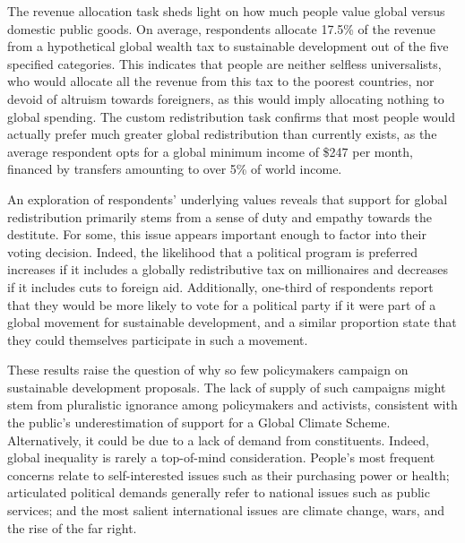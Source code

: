 \documentclass[12pt,english]{article}
\begin{document}
\begin{bibunit}
The revenue allocation task sheds light on how much people value global versus domestic public goods. On average, respondents allocate 17.5\% of the revenue from a hypothetical global wealth tax to sustainable development out of the five specified categories. 
This indicates that people are neither selfless universalists, who would allocate all the revenue from this tax to the poorest countries, nor devoid of altruism towards foreigners, as this would imply allocating nothing to global spending. 
The custom redistribution task confirms that most people would actually prefer much greater global redistribution than currently exists, as the average respondent opts for a global minimum income of \$247 per month, financed by transfers amounting to over 5\% of world income. 

An exploration of respondents' underlying values reveals that support for global redistribution primarily stems from a sense of duty and empathy towards the destitute. For some, this issue appears important enough to factor into their voting decision. Indeed, the likelihood that a political program is preferred increases if it includes a globally redistributive tax on millionaires and decreases if it includes cuts to foreign aid. Additionally, one-third of respondents report that they would be more likely to vote for a political party if it were part of a global movement for sustainable development, and a similar proportion state that they could themselves participate in such a movement. 

These results raise the question of why so few policymakers campaign on sustainable development proposals. The lack of supply of such campaigns might stem from pluralistic ignorance among policymakers and activists, consistent with the public's underestimation of support for a Global Climate Scheme. %
Alternatively, it could be due to a lack of demand from constituents. Indeed, global inequality is rarely a top-of-mind consideration. People's most frequent concerns relate to self-interested issues such as their purchasing power or health; articulated political demands generally refer to national issues such as public services; and the most salient international issues are climate change, wars, and the rise of the far right. 


\end{bibunit}
\end{document}
